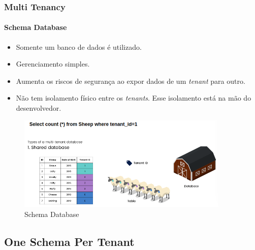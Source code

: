 \documentclass[
	9pt, %
	t, %
]{beamer}
\begin{document}
\begin{frame}
	\frametitle{Multi Tenancy}
	\framesubtitle{Schema Database}

	\begin{itemize}
		\item Somente um banco de dados é utilizado.
		\item Gerenciamento simples.
		\item \alert{Aumenta os riscos de segurança ao expor dados de um \textit{tenant} para outro.}
		\item \alert{Não tem isolamento físico entre os \textit{tenants}.} Esse isolamento está na mão do desenvolvedor.
		
	\end{itemize}

	\begin{figure}
		\centering
		\includegraphics[width=0.9\textwidth]{schema_database.png}
		\caption{Schema Database}
	\end{figure}

\end{frame}

\subsection{One Schema Per Tenant}
\end{document}
